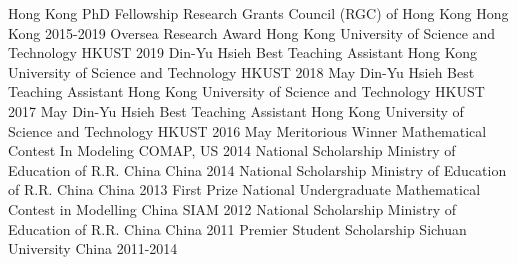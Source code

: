 \begin{cvhonors}
  \cvhonor
    {Hong Kong PhD Fellowship}
    {Research Grants Council (RGC) of Hong Kong}
    {Hong Kong}
    {2015-2019}
    \cvhonor
    {Oversea Research Award}
    {Hong Kong University of Science and Technology}
    {HKUST}
    {2019}
  \cvhonor
    {Din-Yu Hsieh Best Teaching Assistant}
    {Hong Kong University of Science and Technology}
    {HKUST}
    {2018 May}
  \cvhonor
    {Din-Yu Hsieh Best Teaching Assistant}
    {Hong Kong University of Science and Technology}
    {HKUST}
    {2017 May}
  \cvhonor
    {Din-Yu Hsieh Best Teaching Assistant}
    {Hong Kong University of Science and Technology}
    {HKUST}
    {2016 May}
  \cvhonor
    {Meritorious Winner}
    {Mathematical Contest In Modeling}
    {COMAP, US}
    {2014}
  \cvhonor
    {National Scholarship}
    {Ministry of Education of R.R. China}
    {China}
    {2014}
  \cvhonor
    {National Scholarship}
    {Ministry of Education of R.R. China}
    {China}
    {2013}   
  \cvhonor
    {First Prize}
    {National Undergraduate Mathematical Contest in Modelling}
    {China SIAM}
    {2012}    
  \cvhonor
    {National Scholarship}
    {Ministry of Education of R.R. China}
    {China}
    {2011}
  \cvhonor
    {Premier Student Scholarship}
    {Sichuan University}
    {China}
    {2011-2014}
\end{cvhonors}


